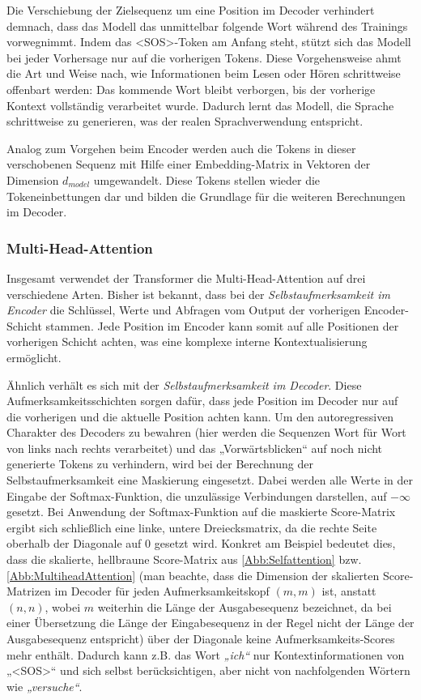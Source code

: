 Die Verschiebung der Zielsequenz um eine Position im Decoder verhindert demnach, dass das Modell das unmittelbar folgende Wort während des Trainings vorwegnimmt. Indem das <SOS>-Token am Anfang steht, stützt sich das Modell bei jeder Vorhersage nur auf die vorherigen Tokens. Diese Vorgehensweise ahmt die Art und Weise nach, wie Informationen beim Lesen oder Hören schrittweise offenbart werden: Das kommende Wort bleibt verborgen, bis der vorherige Kontext vollständig verarbeitet wurde. Dadurch lernt das Modell, die Sprache schrittweise zu generieren, was der realen Sprachverwendung entspricht.

Analog zum Vorgehen beim Encoder werden auch die Tokens in dieser verschobenen Sequenz mit Hilfe einer Embedding-Matrix in Vektoren der Dimension $d_{model}$ umgewandelt. Diese Tokens stellen wieder die Tokeneinbettungen dar und bilden die Grundlage für die weiteren Berechnungen im Decoder.

\subsubsection*{Multi-Head-Attention}

Insgesamt verwendet der Transformer die Multi-Head-Attention auf drei verschiedene Arten. Bisher ist bekannt, dass bei der \emph{Selbstaufmerksamkeit im Encoder} die Schlüssel, Werte und Abfragen vom Output der vorherigen Encoder-Schicht stammen. Jede Position im Encoder kann somit auf alle Positionen der vorherigen Schicht achten, was eine komplexe interne Kontextualisierung ermöglicht.

Ähnlich verhält es sich mit der \emph{Selbstaufmerksamkeit im Decoder}. Diese Aufmerksamkeitsschichten sorgen dafür, dass jede Position im Decoder nur auf die vorherigen und die aktuelle Position achten kann. Um den autoregressiven Charakter des Decoders zu bewahren (hier werden die Sequenzen Wort für Wort von links nach rechts verarbeitet) und das „Vorwärtsblicken“ auf noch nicht generierte Tokens zu verhindern, wird bei der Berechnung der Selbstaufmerksamkeit eine Maskierung eingesetzt. Dabei werden alle Werte in der Eingabe der Softmax-Funktion, die unzulässige Verbindungen darstellen, auf $-\infty$ gesetzt. Bei Anwendung der Softmax-Funktion auf die maskierte Score-Matrix ergibt sich schließlich eine linke, untere Dreiecksmatrix, da die rechte Seite oberhalb der Diagonale auf 0 gesetzt wird. Konkret am Beispiel bedeutet dies, dass die skalierte, hellbraune Score-Matrix aus \cref{Abb:Selfattention} bzw. \cref{Abb:MultiheadAttention} (man beachte, dass die Dimension der skalierten Score-Matrizen im Decoder für jeden Aufmerksamkeitskopf $(m, m)$ ist, anstatt $(n, n)$, wobei $m$ weiterhin die Länge der Ausgabesequenz bezeichnet, da bei einer Übersetzung die Länge der Eingabesequenz in der Regel nicht der Länge der Ausgabesequenz entspricht) über der Diagonale keine Aufmerksamkeits-Scores mehr enthält. Dadurch kann z.B. das Wort \emph{„ich“} nur Kontextinformationen von „<SOS>“ und sich selbst berücksichtigen, aber nicht von nachfolgenden Wörtern wie \emph{„versuche“}.  

